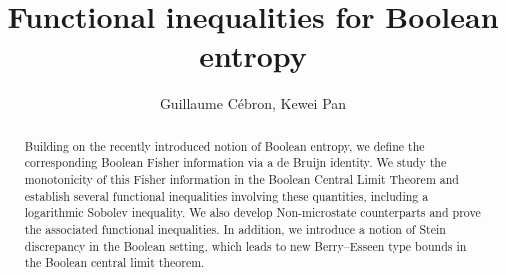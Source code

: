 \documentclass[10pt, reqno]{amsart}
\numberwithin{equation}{section}
\theoremstyle{definition}
\theoremstyle{plain}
\theoremstyle{remark}
\newcommand{\1}{\mathbbm{1}}
\begin{document}
\title{Functional inequalities for Boolean entropy}
\author{Guillaume Cébron, Kewei Pan}
\address[A1,A2]{Univ Toulouse, INSA Toulouse, CNRS, IMT, Toulouse, France.}


\begin{abstract}
Building on the recently introduced notion of Boolean entropy, we define the corresponding Boolean Fisher information via a de Bruijn identity. We study the monotonicity of this Fisher information in the Boolean Central Limit Theorem and establish several functional inequalities involving these quantities, including a logarithmic Sobolev inequality. We also develop Non-microstate counterparts and prove the associated functional inequalities. In addition, we introduce a notion of Stein discrepancy in the Boolean setting, which leads to new Berry--Esseen type bounds in the Boolean central limit theorem.

\end{abstract}


\maketitle


\tableofcontents
\end{document}
